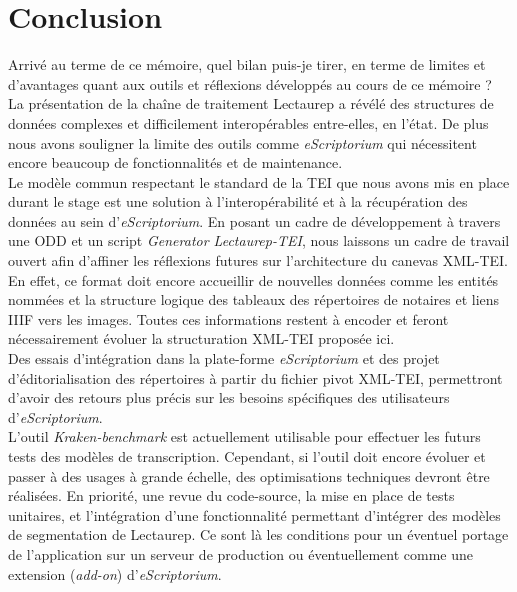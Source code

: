 \part*{Conclusion}

Arrivé au terme de ce mémoire, quel bilan puis-je tirer, en terme de limites et d'avantages quant aux outils et réflexions développés au cours de ce mémoire ?\\

La présentation de la chaîne de traitement Lectaurep a révélé des structures de données complexes et difficilement interopérables entre-elles, en l'état. De plus nous avons souligner la limite des outils comme \textit{eScriptorium} qui nécessitent encore beaucoup de fonctionnalités et de maintenance.\\

Le modèle commun respectant le standard de la TEI que nous avons mis en place durant le stage est une solution à l'interopérabilité et à la récupération des données au sein d'\textit{eScriptorium}. En posant un cadre de développement à travers une ODD et un script \textit{Generator Lectaurep-TEI}, nous laissons un cadre de travail ouvert afin d'affiner les réflexions futures sur l'architecture du canevas XML-TEI. En effet, ce format doit encore accueillir de nouvelles données comme les entités nommées et la structure logique des tableaux des répertoires de notaires et liens IIIF vers les images. Toutes ces informations restent à encoder et feront nécessairement évoluer la structuration XML-TEI proposée ici.\\

Des essais d'intégration dans la plate-forme \textit{eScriptorium} et des projet d'éditorialisation des répertoires à partir du fichier pivot XML-TEI, permettront d'avoir des retours plus précis sur les besoins spécifiques des utilisateurs d'\textit{eScriptorium}.\\

L'outil \textit{Kraken-benchmark} est actuellement utilisable pour effectuer les futurs tests des modèles de transcription. Cependant, si l'outil doit encore évoluer et passer à des usages à grande échelle, des optimisations techniques devront être réalisées. En priorité, une revue du code-source, la mise en place de tests unitaires, et l'intégration d'une fonctionnalité permettant d'intégrer des modèles de segmentation de Lectaurep. Ce sont là les conditions pour un éventuel portage de l'application sur un serveur de production ou éventuellement comme une extension (\textit{add-on}) d'\textit{eScriptorium}.\\

